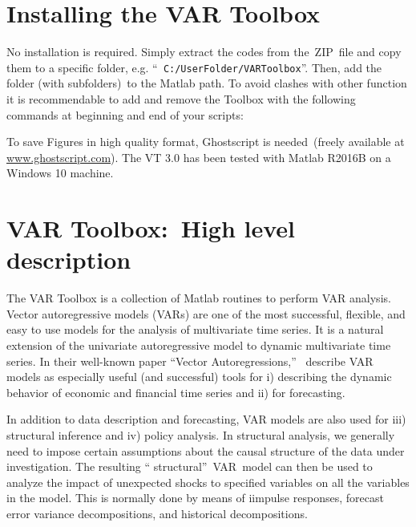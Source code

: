 \documentclass[10pt]{article}
\begin{document}
\section{Installing the VAR Toolbox}

No installation is required. Simply extract the codes from the\ ZIP\ file
and copy them to a specific folder, e.g. \textquotedblleft \texttt{%
C:/UserFolder/VARToolbox}\textquotedblright . Then, add the folder (with
subfolders)\ to the Matlab path. To avoid clashes with other function it is
recommendable to add and remove the Toolbox with the following commands at
beginning and end of your scripts:


To save Figures in high quality format, Ghostscript is needed\ (freely
available at \href{www.ghostscript.com}{www.ghostscript.com}). The VT 3.0
has been tested with Matlab R2016B on a Windows 10 machine.

\section{VAR Toolbox:\ High level description}

The VAR Toolbox is a collection of Matlab routines to perform VAR analysis.
Vector autoregressive models (VARs) are one of the most successful,
flexible, and easy to use models for the analysis of multivariate time
series. It is a natural extension of the univariate autoregressive model to
dynamic multivariate time series. In their well-known paper
\textquotedblleft Vector Autoregressions,\textquotedblright\ \cite%
{StockWatson2000} describe VAR models as especially useful (and successful)
tools for i) describing the dynamic behavior of economic and financial time
series and ii) for forecasting.

In addition to data description and forecasting, VAR models are also used
for iii) structural inference and iv) policy analysis. In structural
analysis, we generally need to impose certain assumptions about the causal
structure of the data under investigation. The resulting \textquotedblleft
structural\textquotedblright\ VAR\ model can then be used to analyze the
impact of unexpected shocks to specified variables on all the variables in
the model. This is normally done by means of {i{impulse responses}}, {%
forecast error variance decompositions}, and {historical decompositions}.
\end{document}
